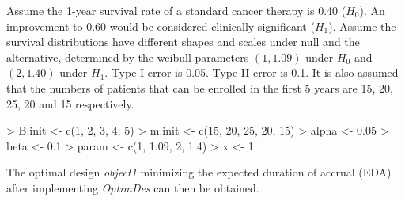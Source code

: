\documentclass[12pt]{article}
\begin{document}
Assume the 1-year survival rate of a standard cancer therapy is 0.40 ($H_0$). An improvement to 0.60 would be
considered clinically significant ($H_1$). Assume the survival distributions have different shapes and scales under
null and the alternative, determined by the weibull parameters $(1, 1.09)$ under $H_0$ and $(2, 1.40)$ under $H_1$.
Type I error is 0.05. Type II error is 0.1. It is also assumed that the numbers of patients that can be enrolled in
the first 5 years are 15, 20, 25, 20 and 15 respectively.
\begin{Schunk}
\begin{Sinput}
> B.init <- c(1, 2, 3, 4, 5)
> m.init <- c(15, 20, 25, 20, 15)
> alpha <- 0.05
> beta <- 0.1
> param <- c(1, 1.09, 2, 1.4)
> x <- 1
\end{Sinput}
\end{Schunk}

The optimal design {\it object1} minimizing the expected duration of accrual (EDA) after
implementing {\it OptimDes} can then be obtained.
\end{document}
